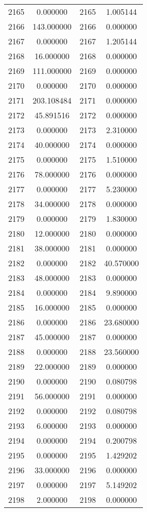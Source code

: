 \documentclass[12pt]{article}
\begin{document}
\begin{longtable}{@{}cccc@{}}
2165 & 0.000000 & 2165 & 1.005144 \\
2166 & 143.000000 & 2166 & 0.000000 \\
2167 & 0.000000 & 2167 & 1.205144 \\
2168 & 16.000000 & 2168 & 0.000000 \\
2169 & 111.000000 & 2169 & 0.000000 \\
2170 & 0.000000 & 2170 & 0.000000 \\
2171 & 203.108484 & 2171 & 0.000000 \\
2172 & 45.891516 & 2172 & 0.000000 \\
2173 & 0.000000 & 2173 & 2.310000 \\
2174 & 40.000000 & 2174 & 0.000000 \\
2175 & 0.000000 & 2175 & 1.510000 \\
2176 & 78.000000 & 2176 & 0.000000 \\
2177 & 0.000000 & 2177 & 5.230000 \\
2178 & 34.000000 & 2178 & 0.000000 \\
2179 & 0.000000 & 2179 & 1.830000 \\
2180 & 12.000000 & 2180 & 0.000000 \\
2181 & 38.000000 & 2181 & 0.000000 \\
2182 & 0.000000 & 2182 & 40.570000 \\
2183 & 48.000000 & 2183 & 0.000000 \\
2184 & 0.000000 & 2184 & 9.890000 \\
2185 & 16.000000 & 2185 & 0.000000 \\
2186 & 0.000000 & 2186 & 23.680000 \\
2187 & 45.000000 & 2187 & 0.000000 \\
2188 & 0.000000 & 2188 & 23.560000 \\
2189 & 22.000000 & 2189 & 0.000000 \\
2190 & 0.000000 & 2190 & 0.080798 \\
2191 & 56.000000 & 2191 & 0.000000 \\
2192 & 0.000000 & 2192 & 0.080798 \\
2193 & 6.000000 & 2193 & 0.000000 \\
2194 & 0.000000 & 2194 & 0.200798 \\
2195 & 0.000000 & 2195 & 1.429202 \\
2196 & 33.000000 & 2196 & 0.000000 \\
2197 & 0.000000 & 2197 & 5.149202 \\
2198 & 2.000000 & 2198 & 0.000000 \\

\end{longtable}
\end{document}
